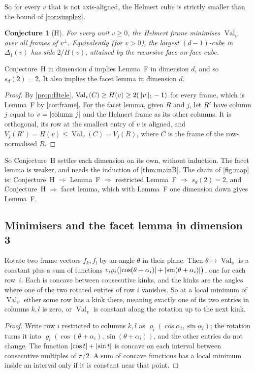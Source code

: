 \documentclass[11pt,a4paper]{article}
\newtheorem{conjecture}[theorem]{Conjecture}
\newcommand{\status}[1]{\textsf{\small[#1]}}
\newcommand{\Val}{\operatorname{Val}}
\begin{document}
So for every $v$ that is not axis-aligned, the Helmert cube is strictly smaller than the bound of \cref{cor:simplex}.

\begin{conjecture}[H]\label{conj:H}
For every unit $v\ge0$, the Helmert frame minimises $\Val_v$ over all frames of $v^\perp$. Equivalently (for $v>0$), the largest $(d-1)$-cube in $\Delta_1(v)$ has side $2/H(v)$, attained by the recursive face-on-face cube.
\end{conjecture}

\begin{proposition}[\status{proof}]\label{prop:Himplies}
Conjecture~H in dimension $d$ implies Lemma~F in dimension $d$, and so $s_d(2)=2$. It also implies the facet lemma in dimension $d$.
\end{proposition}
\begin{proof}
By \cref{prop:Htele}, $\Val_v(C)\ge H(v)\ge2(\norm v_1-1)$ for every frame, which is Lemma~F by \cref{cor:frame}. For the facet lemma, given $R$ and $j$, let $R'$ have column $j$ equal to $v=\lvert \text{column }j\rvert$ and the Helmert frame as its other columns. It is orthogonal, its row at the smallest entry of $v$ is aligned, and $V_j(R')=H(v)\le\Val_v(C)=V_j(R)$, where $C$ is the frame of the row-normalised $R$.
\end{proof}

So Conjecture~H settles each dimension on its own, without induction. The facet lemma is weaker, and needs the induction of \cref{thm:mainB}. The chain of \cref{fig:map} is: Conjecture~H $\Rightarrow$ Lemma~F $\Rightarrow$ restricted Lemma~F $\Rightarrow$ $s_d(2)=2$, and Conjecture~H $\Rightarrow$ facet lemma, which with Lemma~F one dimension down gives Lemma~F.

\subsection{Minimisers and the facet lemma in dimension 3}
\begin{proposition}[\status{proof}]\label{prop:givens}
Rotate two frame vectors $f_k,f_l$ by an angle $\theta$ in their plane. Then $\theta\mapsto\Val_v$ is a constant plus a sum of functions $v_i\varrho_i\bigl(\lvert \cos(\theta+\alpha_i)\rvert+\lvert \sin(\theta+\alpha_i)\rvert\bigr)$, one for each row~$i$. Each is concave between consecutive kinks, and the kinks are the angles where one of the two rotated entries of row $i$ vanishes. So at a local minimum of $\Val_v$ either some row has a kink there, meaning exactly one of its two entries in columns $k,l$ is zero, or $\Val_v$ is constant along the rotation up to the next kink.
\end{proposition}
\begin{proof}
Write row $i$ restricted to columns $k,l$ as $\varrho_i(\cos\alpha_i,\sin\alpha_i)$; the rotation turns it into $\varrho_i(\cos(\theta+\alpha_i),\sin(\theta+\alpha_i))$, and the other entries do not change. The function $\lvert \cos t\rvert+\lvert \sin t\rvert$ is concave on each interval between consecutive multiples of $\pi/2$. A sum of concave functions has a local minimum inside an interval only if it is constant near that point.
\end{proof}
\end{document}
